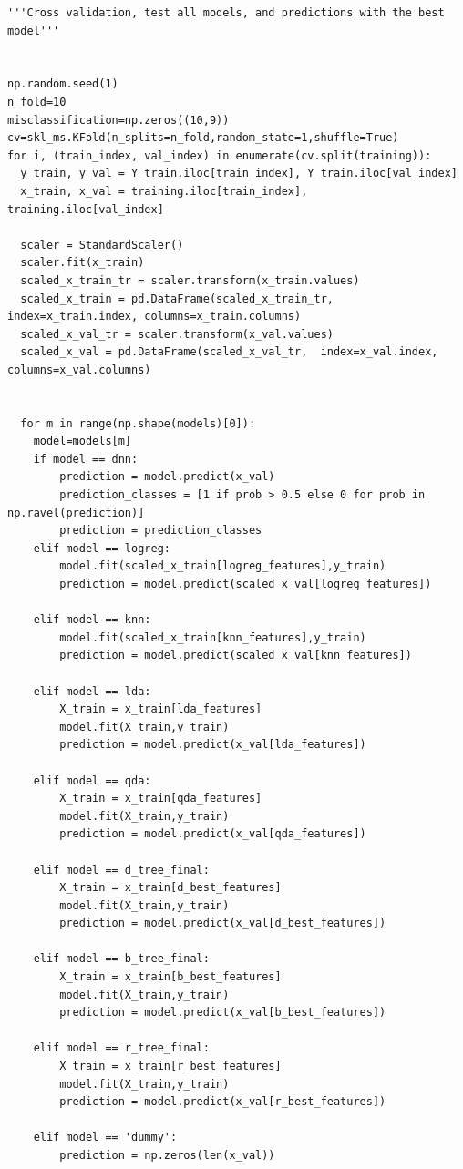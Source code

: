 \documentclass{article}
\begin{document}
\begin{verbatim}
'''Cross validation, test all models, and predictions with the best model'''


np.random.seed(1)
n_fold=10
misclassification=np.zeros((10,9))
cv=skl_ms.KFold(n_splits=n_fold,random_state=1,shuffle=True)
for i, (train_index, val_index) in enumerate(cv.split(training)): 
  y_train, y_val = Y_train.iloc[train_index], Y_train.iloc[val_index]
  x_train, x_val = training.iloc[train_index], training.iloc[val_index]

  scaler = StandardScaler()
  scaler.fit(x_train)
  scaled_x_train_tr = scaler.transform(x_train.values)
  scaled_x_train = pd.DataFrame(scaled_x_train_tr,  index=x_train.index, columns=x_train.columns)
  scaled_x_val_tr = scaler.transform(x_val.values)
  scaled_x_val = pd.DataFrame(scaled_x_val_tr,  index=x_val.index, columns=x_val.columns)


  for m in range(np.shape(models)[0]):
    model=models[m]
    if model == dnn:
        prediction = model.predict(x_val)
        prediction_classes = [1 if prob > 0.5 else 0 for prob in np.ravel(prediction)]
        prediction = prediction_classes
    elif model == logreg:
        model.fit(scaled_x_train[logreg_features],y_train)
        prediction = model.predict(scaled_x_val[logreg_features])

    elif model == knn:
        model.fit(scaled_x_train[knn_features],y_train)
        prediction = model.predict(scaled_x_val[knn_features])

    elif model == lda:
        X_train = x_train[lda_features]
        model.fit(X_train,y_train)
        prediction = model.predict(x_val[lda_features])

    elif model == qda:
        X_train = x_train[qda_features]
        model.fit(X_train,y_train)
        prediction = model.predict(x_val[qda_features])

    elif model == d_tree_final:
        X_train = x_train[d_best_features]
        model.fit(X_train,y_train)
        prediction = model.predict(x_val[d_best_features])

    elif model == b_tree_final:
        X_train = x_train[b_best_features]
        model.fit(X_train,y_train)
        prediction = model.predict(x_val[b_best_features])

    elif model == r_tree_final:
        X_train = x_train[r_best_features]
        model.fit(X_train,y_train)
        prediction = model.predict(x_val[r_best_features])

    elif model == 'dummy':
        prediction = np.zeros(len(x_val))
    

\end{verbatim}
\end{document}
